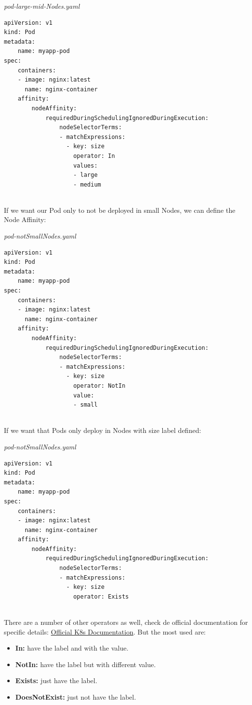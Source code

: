\documentclass{article}
\newenvironment{codetemplate}[1][]{%
  \mybasecolorbox[#1]
  \itshape
}{%
  \endmybasecolorbox
}
\begin{document}
\begin{codetemplate}{pod-large-mid-Nodes.yaml}
\begin{verbatim}
apiVersion: v1
kind: Pod
metadata:
    name: myapp-pod
spec:
    containers:
    - image: nginx:latest
      name: nginx-container
    affinity:
        nodeAffinity:
            requiredDuringSchedulingIgnoredDuringExecution:
                nodeSelectorTerms:
                - matchExpressions:
                  - key: size
                    operator: In
                    values:
                    - large
                    - medium
                    
\end{verbatim}
\end{codetemplate}

If we want our Pod only to not be deployed in small Nodes, we can define the Node Affinity:

\begin{codetemplate}{pod-notSmallNodes.yaml}
\begin{verbatim}
apiVersion: v1
kind: Pod
metadata:
    name: myapp-pod
spec:
    containers:
    - image: nginx:latest
      name: nginx-container
    affinity:
        nodeAffinity:
            requiredDuringSchedulingIgnoredDuringExecution:
                nodeSelectorTerms:
                - matchExpressions:
                  - key: size
                    operator: NotIn
                    value:
                    - small
                    
\end{verbatim}
\end{codetemplate}

If we want that Pods only deploy in Nodes with size label defined:

\begin{codetemplate}{pod-notSmallNodes.yaml}
\begin{verbatim}
apiVersion: v1
kind: Pod
metadata:
    name: myapp-pod
spec:
    containers:
    - image: nginx:latest
      name: nginx-container
    affinity:
        nodeAffinity:
            requiredDuringSchedulingIgnoredDuringExecution:
                nodeSelectorTerms:
                - matchExpressions:
                  - key: size
                    operator: Exists
                    
\end{verbatim}
\end{codetemplate}

There are a number of other operators as well, check de official documentation for specific details: \href{https://kubernetes.io/docs/concepts/scheduling-eviction/assign-pod-node/}{Official K8s Documentation}. But the most used are:
\begin{itemize}
    \item \textbf{In:} have the label and with the value.
    \item \textbf{NotIn:} have the label but with different value.
    \item \textbf{Exists:} just have the label.
    \item \textbf{DoesNotExist:} just not have the label.
\end{itemize}
\end{document}
